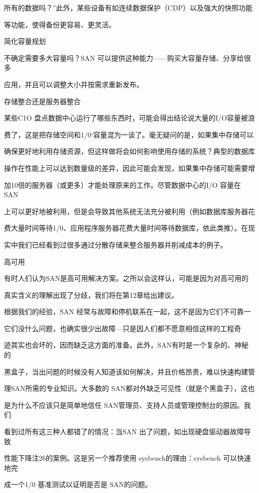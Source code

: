 所有的数据吗？”此外，某些设备有如连续数据保护（CDP）以及强大的快照功能

等功能，使得备份更容易、更灵活。

简化容量规划

不确定需要多大容量吗？SAN 可以提供这种能力——购买大容量存储、分享给很多

应用，并且可以调整大小并按需求重新发布。

存储整合还是服务器整合

某些C1O 盘点数据中心运行了哪些东西时，可能会得出结论说大量的I/O容量被浪

费了，这是把存储空间和1/0‘容量混为一谈了。毫无疑问的是，如果集中存储可以

确保更好地利用存储资源，但这样做将会如何影响使用存储的系统？典型的数据库

操作在性能上可以达到数量级的差异，因此可能会发现，如果集中存储可能需要增

加10倍的服务器（或更多）才能处理原来的工作。尽管数据中心的I/O 容量在 SAN

上可以更好地被利用，但是会导致其他系统无法充分被利用（例如数据库服务器花

费大量时间等待1/0、应用程序服务器花费大量时间等待数据库，依此类推）。在现

实中我们已经看到过很多通过分散存储来整合服务器并削减成本的例子。

高可用

有时人们认为SAN是高可用解决方案。之所以会这样认，可能是因为对高可用的

真实含义的理解出现了分歧，我们将在第12章给出建议。

根据我们的经验，SAN 经常与故障和停机联系在一起，这不是因为它们不可靠一

它们没什么问题，也确实很少出故障—只是因人们都不愿意相信这样的工程奇

迹其实也会坏的，因而缺乏这方面的准备。此外，SAN有时是一个复杂的、神秘的

黑盒子，当出问题的时候没有人知道该如何解决，并且价格昂贵，难以快速构建管

理SAN所需的专业知识。大多数的 SAN都对外缺乏可见性（就是个黑盒子），这也

是为什么不应该只是简单地信任 SAN管理员、支持人员或管理控制台的原因。我们

看到过所有这三种人都错了的情况：当SAN 出了问题，如出现硬盘驱动器故障导致

性能下降注26的案例。这是另一个推荐使用 sysbench的理由：sysbench 可以快速地完

成一个1/0 基准测试以证明是否是 SAN的问题。

